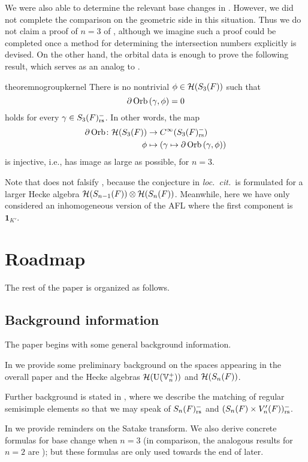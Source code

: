 We were also able to determine the
relevant base changes in .
However, we did not complete the comparison on the geometric side in this situation.
Thus we do not claim a proof of $n = 3$ of ,
although we imagine such a proof could be completed
once a method for determining the intersection numbers explicitly is devised.
On the other hand, the orbital data is enough to prove the following result,
which serves as an analog to .
\begin{restatable}{theorem}{nogroupkernel}
  \label{thm:no_kernel_group}
  There is no nontrivial $\phi \in \mathcal H(S_3(F))$ such that
  \[ \partial \operatorname{Orb} \left( \gamma, \phi \right) = 0 \]
  holds for every $\gamma \in S_3(F)_{\mathrm{rs}}^-$.
  In other words, the map
  \begin{align*}
    \partial\operatorname{Orb} \colon \mathcal H(S_3(F)) &\to C^\infty(S_3(F)_{\mathrm{rs}}^-) \\
    \phi &\mapsto \left( \gamma \mapsto \partial \operatorname{Orb} \left(\gamma, \phi \right) \right)
  \end{align*}
  is injective, i.e., has image as large as possible, for $n = 3$.
\end{restatable}
\begin{remark}
  Note that  does not falsify
  \cite[Conjecture 1.0.2]{ref:AFLspherical},
  because the conjecture in \emph{loc.\ cit.}\ is formulated
  for a larger Hecke algebra $\mathcal H(S_{n-1}(F)) \otimes \mathcal H(S_n(F))$.
  Meanwhile, here we have only considered an inhomogeneous version of the AFL
  where the first component is $\mathbf{1}_{K'}$.
\end{remark}

\section{Roadmap}
The rest of the paper is organized as follows.

\subsection{Background information}
The paper begins with some general background information.
\begin{itemize}
  \ii In  we provide some preliminary background
  on the spaces appearing in the overall paper and the Hecke algebras
  $\mathcal H(\operatorname{U}(\mathbb V_n^+))$ and $\mathcal H(S_n(F))$.

  \ii Further background is stated in ,
  where we describe the matching of regular semisimple elements
  so that we may speak of $S_n(F)_{\mathrm{rs}}^-$ and $(S_n(F) \times V'_n(F))_{\mathrm{rs}}^-$.

  \ii In  we provide reminders on the Satake transform.
  We also derive concrete formulas for base change when $n = 3$
  (in comparison, the analogous results for $n=2$ are
  \cite[Lemma 7.1.1]{ref:AFLspherical});
  but these formulas are only used towards the end of  later.
\end{itemize}

